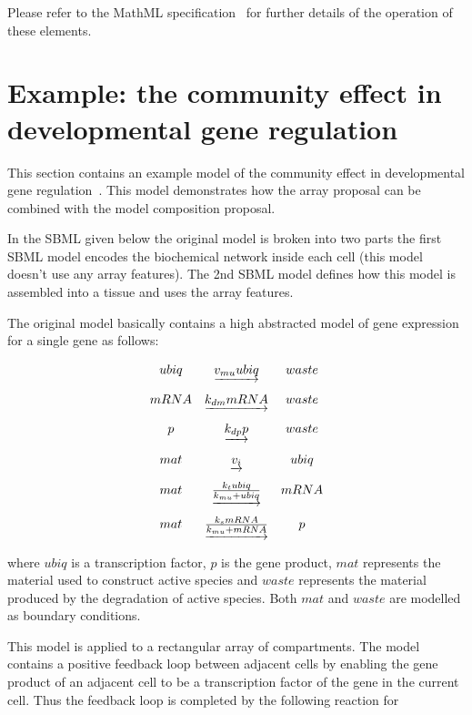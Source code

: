 \documentclass{cekarticle}
\begin{document}
Please refer to the MathML specification~\citep{w3c:2000b} for further details of the operation of these elements.

\section{Example: the community effect in developmental gene regulation}

This section contains an example model of the community effect in
developmental gene regulation~\citep{gurdon:1988}.  This model demonstrates how
the array proposal can be combined with the model composition proposal.

In the SBML given below the original model is broken into two parts the first SBML model
encodes the biochemical network inside each cell (this model doesn't use any array features).
The 2nd SBML model defines how this model is assembled into a tissue and uses the array features.

The original model basically contains a
high abstracted model of gene expression for a single gene as follows:

\begin{equation*}
  \begin{array}{@{}ccc@{}}
    ubiq & \underrightarrow{v_{mu} ubiq} & waste \\ \\[-4pt]
    mRNA & \underrightarrow{k_{dm} mRNA} & waste \\ \\[-4pt]
    p & \underrightarrow{k_{dp} p} & waste \\ \\[-4pt]
    mat & \underrightarrow{v_i} & ubiq \\ \\[-4pt]
    mat & \underrightarrow{\frac{k_t ubiq}{k_{mu} + ubiq}} & mRNA \\ \\[-4pt]
    mat & \underrightarrow{\frac{k_s mRNA}{k_{mu} + mRNA}} & p
  \end{array}
\end{equation*}

where $ubiq$ is a transcription factor, $p$ is the gene product,
$mat$ represents the material used to construct active species and
$waste$ represents the material produced by the degradation of
active species.  Both $mat$ and $waste$ are modelled as boundary
conditions.

This model is applied to a rectangular array of compartments. The
model contains a positive feedback loop between adjacent cells by
enabling the gene product of an adjacent cell to be a
transcription factor of the gene in the current cell. Thus the
feedback loop is completed by the following reaction for 
\end{document}
